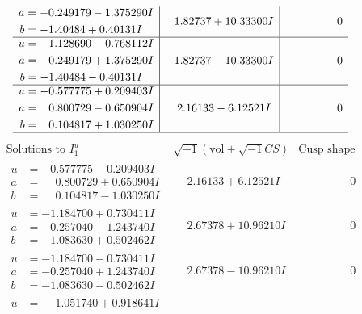 \documentclass[1p]{elsarticle_modified}
\theoremstyle{definition}
\newcommand{\I}{\sqrt{-1}}
\begin{document}
$$\begin{array}{c|c|c}
\begin{aligned}
a &= -0.249179 - 1.375290 I \\
b &= -1.40484 + 0.40131 I\end{aligned}
 & \phantom{-}1.82737 + 10.33300 I & \phantom{-0.000000 } 0 \\ \hline\begin{aligned}
u &= -1.128690 - 0.768112 I \\
a &= -0.249179 + 1.375290 I \\
b &= -1.40484 - 0.40131 I\end{aligned}
 & \phantom{-}1.82737 - 10.33300 I & \phantom{-0.000000 } 0 \\ \hline\begin{aligned}
u &= -0.577775 + 0.209403 I \\
a &= \phantom{-}0.800729 - 0.650904 I \\
b &= \phantom{-}0.104817 + 1.030250 I\end{aligned}
 & \phantom{-}2.16133 - 6.12521 I & \phantom{-0.000000 } 0\\
 \hline 
 \end{array}$$\newpage$$\begin{array}{c|c|c}  
\text{Solutions to }I^u_{1}& \I (\text{vol} + \sqrt{-1}CS) & \text{Cusp shape}\\
 \hline 
\begin{aligned}
u &= -0.577775 - 0.209403 I \\
a &= \phantom{-}0.800729 + 0.650904 I \\
b &= \phantom{-}0.104817 - 1.030250 I\end{aligned}
 & \phantom{-}2.16133 + 6.12521 I & \phantom{-0.000000 } 0 \\ \hline\begin{aligned}
u &= -1.184700 + 0.730411 I \\
a &= -0.257040 - 1.243740 I \\
b &= -1.083630 + 0.502462 I\end{aligned}
 & \phantom{-}2.67378 + 10.96210 I & \phantom{-0.000000 } 0 \\ \hline\begin{aligned}
u &= -1.184700 - 0.730411 I \\
a &= -0.257040 + 1.243740 I \\
b &= -1.083630 - 0.502462 I\end{aligned}
 & \phantom{-}2.67378 - 10.96210 I & \phantom{-0.000000 } 0 \\ \hline\begin{aligned}
u &= \phantom{-}1.051740 + 0.918641 I \\

\end{aligned}
\end{array}$$
\end{document}

